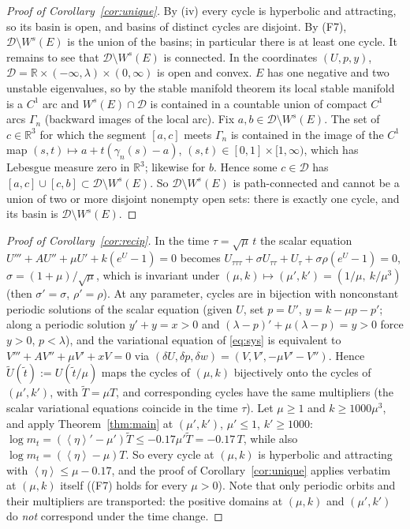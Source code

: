 \documentclass[11pt,a4paper]{article}
\theoremstyle{remark}\newtheorem{remark}[theorem]{Remark}
\newcommand{\avg}[1]{\left\langle #1\right\rangle}
\begin{document}
\begin{proof}[Proof of Corollary~\ref{cor:unique}]
By (iv) every cycle is hyperbolic and attracting, so its basin is open, and basins of distinct cycles
are disjoint. By (F7), $\mathcal D\setminus W^s(E)$ is the union of the basins; in particular there is at
least one cycle. It remains to see that $\mathcal D\setminus W^s(E)$ is connected. In the coordinates
$(U,p,y)$, $\mathcal D=\mathbb R\times(-\infty,\lambda)\times(0,\infty)$ is open and convex. $E$ has one
negative and two unstable eigenvalues, so by the stable manifold theorem its local stable manifold is a
$C^1$ arc and $W^s(E)\cap\mathcal D$ is contained in a countable union of compact $C^1$ arcs $\Gamma_n$
(backward images of the local arc). Fix $a,b\in\mathcal D\setminus W^s(E)$. The set of $c\in\mathbb R^3$
for which the segment $[a,c]$ meets $\Gamma_n$ is contained in the image of the $C^1$ map
$(s,t)\mapsto a+t(\gamma_n(s)-a)$, $(s,t)\in[0,1]\times[1,\infty)$, which has Lebesgue measure zero in
$\mathbb R^3$; likewise for $b$. Hence some $c\in\mathcal D$ has
$[a,c]\cup[c,b]\subset\mathcal D\setminus W^s(E)$. So $\mathcal D\setminus W^s(E)$ is path-connected and
cannot be a union of two or more disjoint nonempty open sets: there is exactly one cycle, and its basin
is $\mathcal D\setminus W^s(E)$.
\end{proof}

\begin{proof}[Proof of Corollary~\ref{cor:recip}]
In the time $\tau=\sqrt\mu\,t$ the scalar equation $U'''+AU''+\mu U'+k(e^U-1)=0$ becomes
$U_{\tau\tau\tau}+\sigma U_{\tau\tau}+U_\tau+\sigma\rho(e^U-1)=0$, $\sigma=(1+\mu)/\sqrt\mu$, which is
invariant under $(\mu,k)\mapsto(\mu',k')=(1/\mu,\ k/\mu^3)$ (then $\sigma'=\sigma$, $\rho'=\rho$).
At any parameter, cycles are in bijection with nonconstant periodic solutions of the scalar equation
(given $U$, set $p=U'$, $y=k-\mu p-p'$; along a periodic solution $y'+y=x>0$ and
$(\lambda-p)'+\mu(\lambda-p)=y>0$ force $y>0$, $p<\lambda$), and the variational equation of
\eqref{eq:sys} is equivalent to $V'''+AV''+\mu V'+xV=0$ via
$(\delta U,\delta p,\delta w)=(V,V',-\mu V'-V'')$. Hence $\tilde U(\tilde t):=U(\tilde t/\mu)$ maps the
cycles of $(\mu,k)$ bijectively onto the cycles of $(\mu',k')$, with $\tilde T=\mu T$, and corresponding
cycles have the same multipliers (the scalar variational equations coincide in the time $\tau$). Let
$\mu\ge1$ and $k\ge1000\mu^3$, and apply Theorem~\ref{thm:main} at $(\mu',k')$, $\mu'\le1$, $k'\ge1000$:
$\log m_t=(\avg{\eta}'-\mu')\tilde T\le-0.17\mu'\tilde T=-0.17\,T$, while also
$\log m_t=(\avg\eta-\mu)T$. So every cycle at $(\mu,k)$ is hyperbolic and attracting with
$\avg\eta\le\mu-0.17$, and the proof of Corollary~\ref{cor:unique} applies verbatim at $(\mu,k)$ itself
((F7) holds for every $\mu>0$). Note that only periodic orbits and their multipliers are transported:
the positive domains at $(\mu,k)$ and $(\mu',k')$ do \emph{not} correspond under the time change.
\end{proof}
\end{document}

